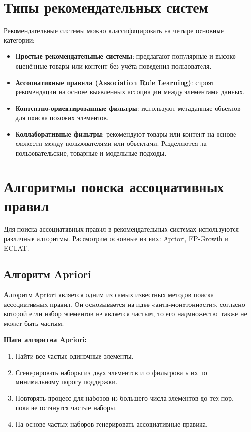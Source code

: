 \section{Типы рекомендательных систем}

Рекомендательные системы можно классифицировать на четыре основные категории:

\begin{itemize}
    \item \textbf{Простые рекомендательные системы}: предлагают популярные и высоко оценённые товары или контент без учёта поведения пользователя.
    \item \textbf{Ассоциативные правила (Association Rule Learning)}: строят рекомендации на основе выявленных ассоциаций между элементами данных.
    \item \textbf{Контентно-ориентированные фильтры}: используют метаданные объектов для поиска похожих элементов.
    \item \textbf{Коллаборативные фильтры}: рекомендуют товары или контент на основе схожести между пользователями или объектами. Разделяются на пользовательские, товарные и модельные подходы.
\end{itemize}

\section{Алгоритмы поиска ассоциативных правил}

Для поиска ассоциативных правил в рекомендательных системах используются различные алгоритмы. Рассмотрим основные из них: Apriori, FP-Growth и ECLAT.

\subsection{Алгоритм Apriori}

Алгоритм Apriori является одним из самых известных методов поиска ассоциативных правил. Он основывается на идее «анти-монотонности», согласно которой если набор элементов не является частым, то его надмножество также не может быть частым.

\textbf{Шаги алгоритма Apriori:}
\begin{enumerate}
    \item Найти все частые одиночные элементы.
    \item Сгенерировать наборы из двух элементов и отфильтровать их по минимальному порогу поддержки.
    \item Повторять процесс для наборов из большего числа элементов до тех пор, пока не останутся частые наборы.
    \item На основе частых наборов генерировать ассоциативные правила.
\end{enumerate}


